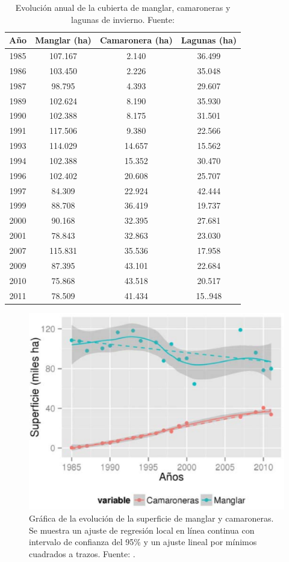 \begin{table}
\centering
\begin{tabular}{@{}cccc@{}}
	\toprule[0.4mm]
	Año & Manglar (ha) & Camaronera (ha) & Lagunas (ha)\\
	\midrule
	1985 & 107.167 & 2.140 & 36.499\\
	1986 & 103.450 & 2.226 & 35.048\\
	1987 & 98.795 & 4.393 & 29.607\\
	\midrule
	1989 & 102.624 & 8.190 & 35.930\\
	1990 & 102.388 & 8.175 & 31.501\\
	1991 & 117.506 & 9.380 & 22.566\\
	\midrule
	1993 & 114.029 & 14.657 & 15.562\\
	1994 & 102.388 & 15.352 & 30.470\\
	\midrule
	1996 & 102.402 & 20.608 & 25.707\\
	1997 & 84.309 & 22.924 & 42.444\\
	\midrule
	1999 & 88.708 & 36.419 & 19.737\\
	2000 & 90.168 & 32.395 & 27.681\\
	2001 & 78.843 & 32.863 & 23.030\\
	\midrule
	2007 & 115.831 & 35.536 & 17.958\\
	\midrule
	2009 & 87.395 & 43.101 & 22.684\\
	2010 & 75.868 & 43.518 & 20.517\\
	2011 & 78.509 & 41.434 & 15..948\\
	\bottomrule[0.4mm]
\end{tabular}
\caption[Evolución anual del manglar]{Evolución anual de la cubierta de manglar, camaroneras y lagunas de invierno. Fuente: \cite{laborate2014}}
\label{tab:evolucion}
\end{table}

\begin{figure}
	\centering
	\includegraphics[width=0.5\linewidth]{./Imagenes/grafico_mangle.eps}
	\caption[Gráfico de evolución anual del manglar]{Gráfica de la evolución de la superficie de manglar y camaroneras. Se muestra un ajuste de regresión local en línea continua con intervalo de confianza del 95\% y un ajuste lineal por mínimos cuadrados a trazos. Fuente: \cite{laborate2014}.}
	\label{fig:grafico_mangle}
\end{figure}

